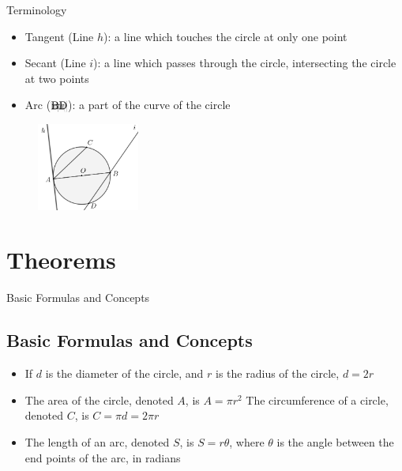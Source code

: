 \documentclass{beamer}
\newcommand{\arc}[1]{{%
		\setbox9=\hbox{#1}%
		\ooalign{\resizebox{\wd9}{\height}{\texttoptiebar{\phantom{A}}}\cr#1}}}
\begin{document}
\begin{frame}{Terminology}
\begin{itemize}
	\item Tangent (Line $h$): a line which touches the circle at only one point
	\item Secant (Line $i$): a line which passes through the circle, intersecting the circle at two points
	\item Arc ($\arc{BD}$): a part of the curve of the circle
\end{itemize}

\begin{figure}[h!]
	\centering
	\includegraphics[width=0.3\textwidth]{Graphics/Week_13/GeometryDiagram.png}
	\label{fig: 2.1}
\end{figure}
\end{frame}

\section{Theorems}
\begin{frame}{Basic Formulas and Concepts}
\subsection{Basic Formulas and Concepts}
\begin{itemize}
	\item If $d$ is the diameter of the circle, and $r$ is the  radius of the circle, $d = 2r$
    \item The area of the circle, denoted $A$, is $A = \pi r^2$
    \itme The circumference of a circle, denoted $C$, is $C = \pi d = 2\pi r$
    \item The length of an arc, denoted $S$, is $S = r\theta$, where $\theta$ is the angle between the end points of the arc, in radians
\end{itemize}
\end{frame}
\end{document}
